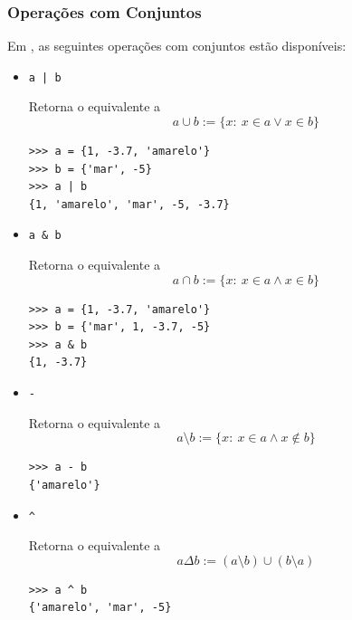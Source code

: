 \subsubsection{Operações com Conjuntos}

Em {\python}, as seguintes operações com conjuntos estão disponíveis:

\begin{itemize}
\item \lstinline+a | b+ 

  Retorna o \PYTHONset equivalente a
  \begin{equation}
    a \cup b := \{x:~x\in a \lor x\in b\}
  \end{equation}

  
\begin{lstlisting}[xrightmargin=2.5em]
>>> a = {1, -3.7, 'amarelo'}
>>> b = {'mar', -5}
>>> a | b
{1, 'amarelo', 'mar', -5, -3.7}
\end{lstlisting}

\item \lstinline+a & b+ 
  
  Retorna o \PYTHONset equivalente a
  \begin{equation}
    a \cap b := \{x:~x\in a \land x\in b\}
  \end{equation}

\begin{lstlisting}[xrightmargin=2.5em]
>>> a = {1, -3.7, 'amarelo'}
>>> b = {'mar', 1, -3.7, -5}
>>> a & b
{1, -3.7}
\end{lstlisting}

\item \lstinline+-+ 

  Retorna o \PYTHONset equivalente a
  \begin{equation}
    a \setminus b := \{x:~x\in a \land x\not\in b\}
  \end{equation}

\begin{lstlisting}[xrightmargin=2.5em]
>>> a - b
{'amarelo'}
\end{lstlisting}

\item \lstinline+^+ 

  Retorna o \PYTHONset equivalente a
  \begin{equation}
    a \Delta b := (a\setminus b)\cup (b\setminus a)
  \end{equation}

\begin{lstlisting}[xrightmargin=2.5em]
>>> a ^ b
{'amarelo', 'mar', -5}
\end{lstlisting}
\end{itemize}

